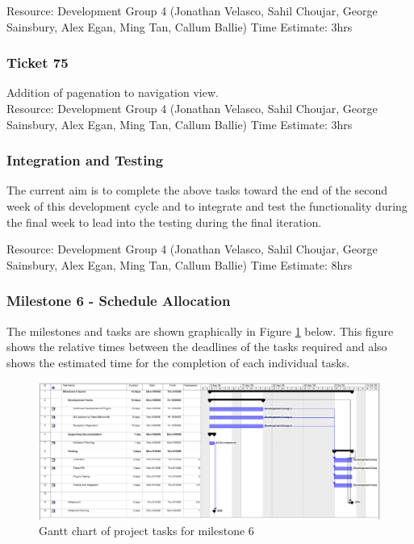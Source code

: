 \documentclass{article}
\begin{document}
	Resource: Development Group 4 (Jonathan Velasco, Sahil Choujar, George Sainsbury, Alex Egan, Ming Tan, Callum Ballie)
	Time Estimate: 3hrs

\subsubsection{Ticket 75}
	Addition of pagenation to navigation view.\\
	
	Resource: Development Group 4 (Jonathan Velasco, Sahil Choujar, George Sainsbury, Alex Egan, Ming Tan, Callum Ballie)
	Time Estimate: 3hrs

\subsubsection{Integration and Testing}
	The current aim is to complete the above tasks toward the end of the second week of this development cycle and to integrate and test the functionality during the final week to lead into the testing during the final iteration.
	
	Resource: Development Group 4 (Jonathan Velasco, Sahil Choujar, George Sainsbury, Alex Egan, Ming Tan, Callum Ballie)
	Time Estimate: 8hrs

\subsubsection{Milestone 6 - Schedule Allocation}

The milestones and tasks are shown graphically in Figure \ref{fig:schedule5} below. This figure shows the relative times between the deadlines of the tasks required and also shows the estimated time for the completion of each individual tasks.\\

\begin{figure}[htp]
\begin{centering}
\includegraphics[angle=90,scale=0.5]{./schedule-milestone6.jpg} 
\par\end{centering}
\caption{Gantt chart of project tasks for milestone 6}
\label{fig:schedule5} 
\end{figure}
\end{document}
